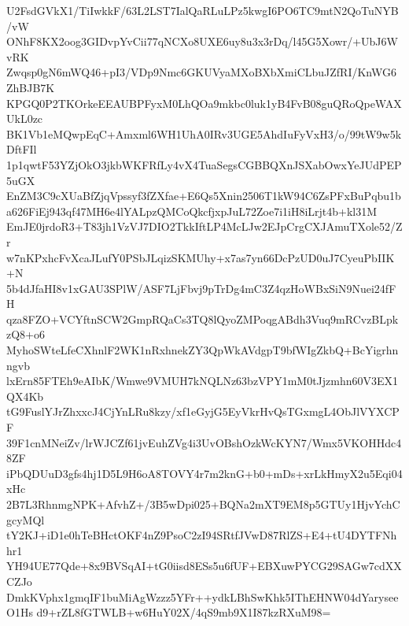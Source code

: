 U2FsdGVkX1/TiIwkkF/63L2LST7IalQaRLuLPz5kwgI6PO6TC9mtN2QoTuNYB/vW
ONhF8KX2oog3GIDvpYvCii77qNCXo8UXE6uy8u3x3rDq/l45G5Xowr/+UbJ6WvRK
Zwqsp0gN6mWQ46+pI3/VDp9Nmc6GKUVyaMXoBXbXmiCLbuJZfRI/KnWG6ZhBJB7K
KPGQ0P2TKOrkeEEAUBPFyxM0LhQOa9mkbc0luk1yB4FvB08guQRoQpeWAXUkL0zc
BK1Vb1eMQwpEqC+Amxml6WH1UhA0IRv3UGE5AhdIuFyVxH3/o/99tW9w5kDftFIl
1p1qwtF53YZjOkO3jkbWKFRfLy4vX4TuaSegsCGBBQXnJSXabOwxYeJUdPEP5uGX
EnZM3C9cXUaBfZjqVpssyf3fZXfae+E6Qs5Xnin2506T1kW94C6ZsPFxBuPqbu1b
a626FiEj943qf47MH6e4lYALpzQMCoQkcfjxpJuL72Zoe7i1iH8iLrjt4b+kl31M
EmJE0jrdoR3+T83jh1VzVJ7DIO2TkkIftLP4McLJw2EJpCrgCXJAmuTXole52/Zr
w7nKPxhcFvXcaJLufY0PSbJLqizSKMUhy+x7as7yn66DcPzUD0uJ7CyeuPbIIK+N
5b4dJfaHI8v1xGAU3SPlW/ASF7LjFbvj9pTrDg4mC3Z4qzHoWBxSiN9Nuei24fFH
qza8FZO+VCYftnSCW2GmpRQaCs3TQ8lQyoZMPoqgABdh3Vuq9mRCvzBLpkzQ8+o6
MyhoSWteLfeCXhnlF2WK1nRxhnekZY3QpWkAVdgpT9bfWIgZkbQ+BcYigrhnngvb
lxErn85FTEh9eAIbK/Wmwe9VMUH7kNQLNz63bzVPY1mM0tJjzmhn60V3EX1QX4Kb
tG9FuslYJrZhxxcJ4CjYnLRu8kzy/xf1eGyjG5EyVkrHvQsTGxmgL4ObJlVYXCPF
39F1cnMNeiZv/lrWJCZf61jvEuhZVg4i3UvOBshOzkWcKYN7/Wmx5VKOHHdc48ZF
iPbQDUuD3gfs4hj1D5L9H6oA8TOVY4r7m2knG+b0+mDs+xrLkHmyX2u5Eqi04xHc
2B7L3RhnmgNPK+AfvhZ+/3B5wDpi025+BQNa2mXT9EM8p5GTUy1HjvYchCgcyMQl
tY2KJ+iD1e0hTeBHctOKF4nZ9PsoC2zI94SRtfJVwD87RlZS+E4+tU4DYTFNhhr1
YH94UE77Qde+8x9BVSqAI+tG0iisd8ESs5u6fUF+EBXuwPYCG29SAGw7cdXXCZJo
DmkKVphx1gmqIF1buMiAgWzzz5YFr++ydkLBhSwKhk5IThEHNW04dYaryseeO1Hs
d9+rZL8fGTWLB+w6HuY02X/4qS9mb9X1I87kzRXuM98=
